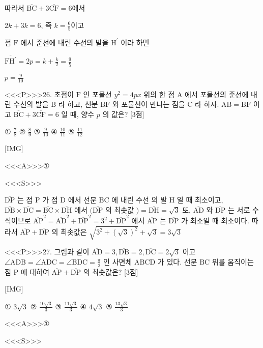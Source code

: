 \documentclass{oblivoir}
\begin{document}
따라서 $\overline{\mathrm{BC}}+3 \overline{\mathrm{CF}}=6$에서

$2 k+3 k=6$, 즉 $k=\frac{6}{5}$이고

점 $\mathrm{F}$ 에서 준선에 내린 수선의 발을 $\mathrm{H}^{\prime}$ 이라 하면

$\overline{\mathrm{FH}^{\prime}}=2 p=k+\frac{k}{2}=\frac{9}{5}$

$p=\frac{9}{10}$


<<<P>>>26. 초점이 $\mathrm{F}$ 인 포물선 $y^{2}=4 p x$ 위의 한 점 $\mathrm{A}$ 에서 포물선의 준선에 내린 수선의 발을 $\mathrm{B}$ 라 하고, 선분 $\mathrm{BF}$ 와 포물선이 만나는 점을 $\mathrm{C}$ 라 하자. $\overline{\mathrm{AB}}=\overline{\mathrm{BF}}$ 이고 $\overline{\mathrm{BC}}+3 \overline{\mathrm{CF}}=6$ 일 때, 양수 $p$ 의 값은? [3점]

① $\frac{7}{8}$
② $\frac{8}{9}$
③ $\frac{9}{10}$
④ $\frac{10}{11}$
⑤ $\frac{11}{12}$


[IMG]


<<<A>>>①

<<<S>>>



$ \overline{\mathrm{DP}}$ 는 점 $\mathrm{P}$ 가 점 $\mathrm{D}$ 에서 선분 $\mathrm{BC}$ 에 내린 수선 의 발 $\mathrm{H}$ 일 때 최소이고, $\overline{\mathrm{DB}} \times \overline{\mathrm{DC}}=\overline{\mathrm{BC}} \times \overline{\mathrm{DH}}$ 에서 $(\overline{\mathrm{DP}}$ 의 최솟값 $)=\overline{\mathrm{DH}}=\sqrt{3}$
또, $\overline{\mathrm{AD}}$ 와 $\overline{\mathrm{DP}}$ 는 서로 수직이므로 $\overline{\mathrm{AP}}^{2}=\overline{\mathrm{AD}}^{2}+\overline{\mathrm{DP}}^{2}=3^{2}+\overline{\mathrm{DP}}^{2}$ 에서 $\overline{\mathrm{AP}}$ 는 $\overline{\mathrm{DP}}$ 가 최소일 때 최소이다. 따라서 $\overline{\mathrm{AP}}+\overline{\mathrm{DP}}$ 의 최솟값은 $\sqrt{3^{2}+(\sqrt{3})^{2}}+\sqrt{3}=3 \sqrt{3}$


<<<P>>>27. 그림과 같이 $\overline{\mathrm{AD}}=3, \overline{\mathrm{DB}}=2, \overline{\mathrm{DC}}=2 \sqrt{3}$ 이고 $\angle \mathrm{ADB}=\angle \mathrm{ADC}=\angle \mathrm{BDC}=\frac{\pi}{2}$ 인 사면체 $\mathrm{ABCD}$ 가 있다. 선분 $\mathrm{BC}$ 위를 움직이는 점 $\mathrm{P}$ 에 대하여 $\overline{\mathrm{AP}}+\overline{\mathrm{DP}}$ 의 최솟값은? [3점]


[IMG]

① $3 \sqrt{3}$
② $\frac{10 \sqrt{3}}{3}$
③ $\frac{11 \sqrt{3}}{3}$
④ $4 \sqrt{3}$
⑤ $\frac{13 \sqrt{3}}{3}$



<<<A>>>①

<<<S>>>
\end{document}
